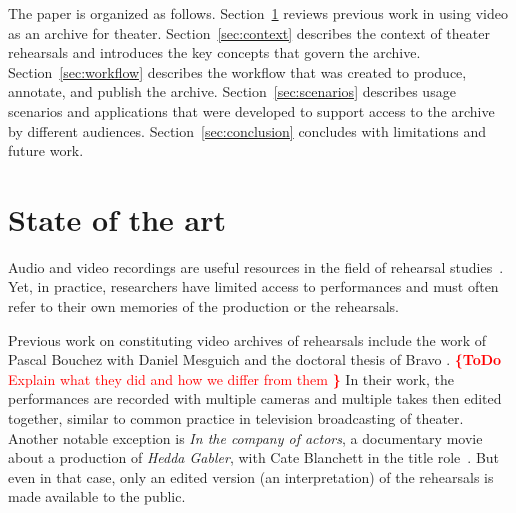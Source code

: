 \documentclass[conference]{IEEEtran}
\newcommand{\todo}[1]{\noindent\textcolor{red}{{\bf \{ToDo} #1{\bf \}}}}
\begin{document}
The paper is organized as follows. Section~\ref{sec:stateoftheart} reviews previous work in using video as an archive for theater. Section~\ref{sec:context} describes the context of theater rehearsals and introduces the key concepts that govern the archive. Section~\ref{sec:workflow} describes the workflow that was created to produce, annotate, and publish the archive. Section~\ref{sec:scenarios} describes usage scenarios and applications that were developed to support access to the archive by different audiences. Section~\ref{sec:conclusion} concludes with limitations and future work.



\section{State of the art}
\label{sec:stateoftheart}

Audio and video recordings are useful resources in the field of rehearsal studies~\cite{mcauley1994video,McAuley98b,McAuley06,McAuley08}. Yet, in practice, researchers have limited access to performances and must often refer to their own memories of the production or the rehearsals. 




Previous work on constituting video archives of rehearsals include the work of Pascal Bouchez with Daniel Mesguich\cite{Bouchez07} and the doctoral thesis of Bravo \cite{Bravo07}. \todo{Explain what they did and how we differ from them }
In their work, the performances are recorded with multiple cameras and multiple takes then edited together, similar to 
common practice in television broadcasting of theater. Another notable exception is {\em In the company of actors}, a documentary movie about a production of \emph{Hedda Gabler}, with Cate Blanchett in the title role~\cite{Darling07}. But even in that case, only an edited version (an interpretation)  of the rehearsals is made available to the public.
\end{document}
